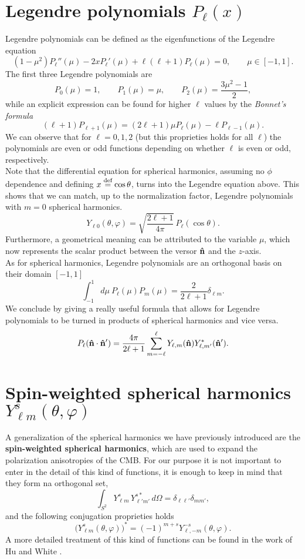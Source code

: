 \section{Legendre polynomials \(P_\ell(x)\)}
\label{app:legendre}
Legendre polynomials can be defined as the eigenfunctions of the Legendre equation 
\[
(1-\mu^2)P_\ell''(\mu)-2xP_\ell'(\mu)+\ell(\ell+1)P_\ell(\mu)=0,\qquad \mu\in[-1,1].
\]
The first three Legendre polynomials are 
$$
P_0(\mu)=1,\qquad P_1(\mu)=\mu,\qquad P_2(\mu)=\frac{3\mu^2-1}{2},
$$
while an explicit expression can be found for higher $\ell$ values by the \emph{Bonnet's formula}
\[
(\ell+1)P_{\ell+1}(\mu)=(2\ell+1)\mu P_\ell(\mu)-\ell P_{\ell-1}(\mu).
\]
We can observe that for $\ell=0,1,2$ (but this proprieties holds for all $\ell$) the polynomials are even or odd functions depending on whether $\ell$ is even or odd, respectively.\\
Note that the differential equation for spherical harmonics, assuming no $\phi$ dependence and defining $x\stackrel{\text{def}}{=}\cos\theta$, turns into the Legendre equation above. This shows that we can match, up to the normalization factor, Legendre polynomials with $m=0$ spherical harmonics.
\[
Y_{\ell 0}(\theta,\varphi)=\sqrt{\frac{2\ell+1}{4\pi}}\,P_\ell(\cos\theta).
\]
Furthermore, a geometrical meaning can be attributed to the variable $\mu$, which now represents the scalar product between the versor $\mathbf{\hat{n}}$ and the $z$-axis.\\
As for spherical harmonics, Legendre polynomials are an orthogonal basis on their domain $[-1,1]$
\[
\int_{-1}^{1}d\mu\ P_\ell(\mu)P_{m}(\mu)=\frac{2}{2\ell+1}\delta_{\ell m}.
\]
We conclude by giving a really useful formula that allows for Legendre polynomials to be turned in products of spherical harmonics and vice versa.
$$
P_\ell(\mathbf{\hat{n}}\cdot\mathbf{\hat{n}}')=\frac{4\pi}{2\ell+1}\sum_{m=-\ell}^\ell Y_{\ell,m}(\mathbf{\hat{n}})Y^*_{\ell,m'}(\mathbf{\hat{n}}').$$



\section{Spin-weighted spherical harmonics \(Y^s_{\ell m}(\theta,\varphi)\)}
\label{app:spin-weighted}
A generalization of the spherical harmonics we have previously introduced are the \textbf{spin-weighted spherical harmonics}, which are used to expand the polarization anisotropies of the CMB. 
For our purpose it is not important to enter in the detail of this kind of functions, it is enough to keep in mind that they form na orthogonal set,
\[
\int_{S^2} Y^s_{\ell m}\,Y^{s*}_{\ell' m'}\,d\Omega=\delta_{\ell\ell'}\delta_{mm'},
\]
and the following conjugation proprieties holds
\[
\big(Y^s_{\ell m}(\theta,\varphi)\big)^*=(-1)^{m+s}Y^{-s}_{\ell,-m}(\theta,\varphi).
\]
A more detailed treatment of this kind of functions can be found in the work of Hu and White \cite{HuWhite}. 


